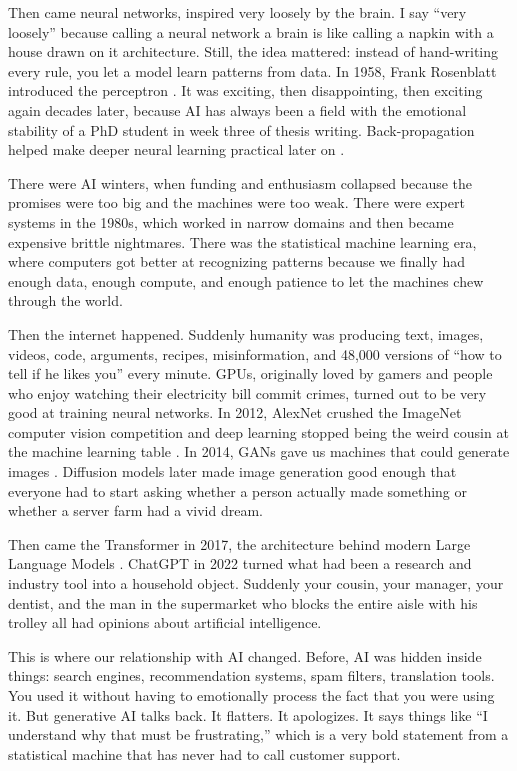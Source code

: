 \documentclass[12pt,oneside]{book}
\begin{document}
Then came neural networks, inspired very loosely by the brain. I say ``very loosely'' because calling a neural network a brain is like calling a napkin with a house drawn on it architecture. Still, the idea mattered: instead of hand-writing every rule, you let a model learn patterns from data. In 1958, Frank Rosenblatt introduced the perceptron \parencite{rosenblatt1958}. It was exciting, then disappointing, then exciting again decades later, because AI has always been a field with the emotional stability of a PhD student in week three of thesis writing. Back-propagation helped make deeper neural learning practical later on \parencite{rumelhart1986}.

There were AI winters, when funding and enthusiasm collapsed because the promises were too big and the machines were too weak. There were expert systems in the 1980s, which worked in narrow domains and then became expensive brittle nightmares. There was the statistical machine learning era, where computers got better at recognizing patterns because we finally had enough data, enough compute, and enough patience to let the machines chew through the world.

Then the internet happened. Suddenly humanity was producing text, images, videos, code, arguments, recipes, misinformation, and 48,000 versions of ``how to tell if he likes you'' every minute. GPUs, originally loved by gamers and people who enjoy watching their electricity bill commit crimes, turned out to be very good at training neural networks. In 2012, AlexNet crushed the ImageNet computer vision competition and deep learning stopped being the weird cousin at the machine learning table \parencite{krizhevsky2012}. In 2014, GANs gave us machines that could generate images \parencite{goodfellow2014}. Diffusion models later made image generation good enough that everyone had to start asking whether a person actually made something or whether a server farm had a vivid dream.

Then came the Transformer in 2017, the architecture behind modern Large Language Models \parencite{vaswani2017}. ChatGPT in 2022 turned what had been a research and industry tool into a household object. Suddenly your cousin, your manager, your dentist, and the man in the supermarket who blocks the entire aisle with his trolley all had opinions about artificial intelligence.

This is where our relationship with AI changed. Before, AI was hidden inside things: search engines, recommendation systems, spam filters, translation tools. You used it without having to emotionally process the fact that you were using it. But generative AI talks back. It flatters. It apologizes. It says things like ``I understand why that must be frustrating,'' which is a very bold statement from a statistical machine that has never had to call customer support.
\end{document}
